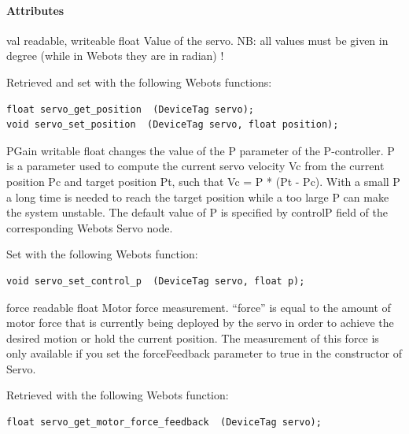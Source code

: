\paragraph{Attributes}
\label{webots.uobjects.robotdevices.servo.attributes}%

\noindent
\begin{itemize}
\begin{attribute}{val}
  {readable, writeable}
  {float}
  {}
  Value of the servo. NB: all values must be given in
 degree (while in Webots they are in radian) !


          Retrieved and set with the following Webots functions:


\begin{lstlisting}
float servo_get_position  (DeviceTag servo);
void servo_set_position  (DeviceTag servo, float position);
\end{lstlisting}
\end{attribute}

\begin{attribute}{PGain}
  {writable}
  {float}
  {}
  changes the value of the P parameter of the
 P-{}controller. P is a parameter used to compute the current servo
 velocity Vc from the current position Pc and target position Pt, such
 that Vc = P * (Pt -{} Pc).  With a small P a long time is needed to
 reach the target position while a too large P can make the system
 unstable.  The default value of P is specified by controlP field of
 the corresponding Webots Servo node.


          Set with the following Webots function:


\begin{lstlisting}
void servo_set_control_p  (DeviceTag servo, float p);
\end{lstlisting}
\end{attribute}

\begin{attribute}{force}
  {readable}
  {float}
  {}
  Motor force measurement. ``force'' is equal to the amount
 of motor force that is currently being deployed by the servo in order
 to achieve the desired motion or hold the current position.  The
 measurement of this force is only available if you set the
 forceFeedback parameter to true in the constructor of Servo.


          Retrieved with the following Webots function:


\begin{lstlisting}
float servo_get_motor_force_feedback  (DeviceTag servo);
\end{lstlisting}
\end{attribute}

\end{itemize}

